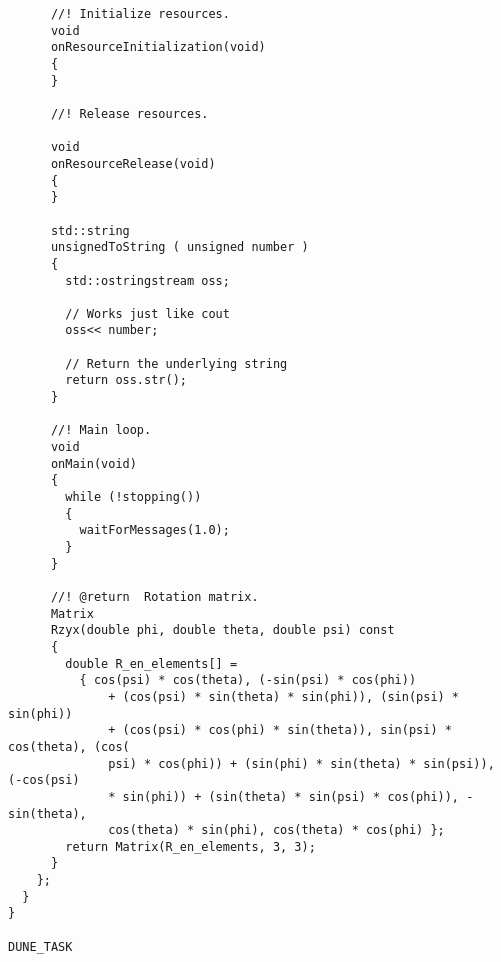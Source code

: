 \begin{frame}[fragile]
\begin{lstlisting}
      //! Initialize resources.
      void
      onResourceInitialization(void)
      {
      }

      //! Release resources.

      void
      onResourceRelease(void)
      {
      }

      std::string
      unsignedToString ( unsigned number )
      {
        std::ostringstream oss;

        // Works just like cout
        oss<< number;

        // Return the underlying string
        return oss.str();
      }

      //! Main loop.
      void
      onMain(void)
      {
        while (!stopping())
        {
          waitForMessages(1.0);
        }
      }

      //! @return  Rotation matrix.
      Matrix
      Rzyx(double phi, double theta, double psi) const
      {
        double R_en_elements[] =
          { cos(psi) * cos(theta), (-sin(psi) * cos(phi))
              + (cos(psi) * sin(theta) * sin(phi)), (sin(psi) * sin(phi))
              + (cos(psi) * cos(phi) * sin(theta)), sin(psi) * cos(theta), (cos(
              psi) * cos(phi)) + (sin(phi) * sin(theta) * sin(psi)), (-cos(psi)
              * sin(phi)) + (sin(theta) * sin(psi) * cos(phi)), -sin(theta),
              cos(theta) * sin(phi), cos(theta) * cos(phi) };
        return Matrix(R_en_elements, 3, 3);
      }
    };
  }
}

DUNE_TASK

\end{lstlisting}
\end{frame}